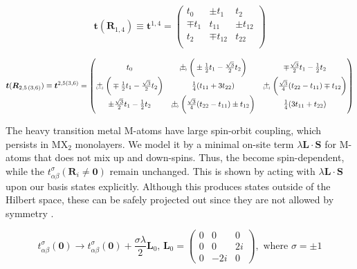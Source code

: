 \begin{equation}
\bm t (\bm R_{1, 4}) \equiv \bm t^{1, 4} =
\begin{pmatrix}
t_0 & \pm t_1 & t_2 \\
\mp t_1 & t_{11} & \pm t_{12} \\
t_2 & \mp t_{12} & t_{22} \\
\end{pmatrix}
\end{equation}

\begin{equation}
\bm t (\bm R_{2,5\,(3,6)})  \equiv \bm t^{2, 5 (3, 6)}  =
\begin{pmatrix}
t_0 & \Pm \bigg( \pm \frac{1}{2} t_1 - \frac{\sqrt{3}}{2} t_2 \bigg) & \mp \frac{\sqrt{3}}{2} t_1 - \frac{1}{2} t_2 \\
\Pm \bigg( \mp \frac{1}{2} t_1 - \frac{\sqrt{3}}{2} t_2 \bigg) & \frac{1}{4} ( t_{11} + 3 t_{22} ) & \Pm \bigg( \frac{\sqrt{3}}{4} ( t_{22} - t_{11} ) \mp t_{12} \bigg) \\
\pm \frac{\sqrt{3}}{2} t_1 - \frac{1}{2} t_2 & \Pm \bigg( \frac{\sqrt{3}}{4} ( t_{22} - t_{11} ) \pm t_{12} \bigg) & \frac{1}{4} ( 3 t_{11} + t_{22} )
\end{pmatrix}
\end{equation}

The heavy transition metal $\text{M}$-atoms have large spin-orbit coupling, which persists in $\text{M}\text{X}_2$ monolayers.
We model it by a minimal on-site term $\lambda \bm L \cdot \bm S$ for $\text{M}$-atoms that does not mix up and down-spins.
Thus, the  become spin-dependent, while the $t_{\alpha \beta}^\sigma ( \bm R_i \neq \bm 0 ) $ remain unchanged.
This is shown by acting with $\lambda \bm L \cdot \bm S$ upon our basis states explicitly.
Although this produces states outside of the Hilbert space, these can be safely projected out since they are not allowed by symmetry \cite{liu_three-band_2013,braz_electronic_2015}.

\begin{equation}
t_{\alpha \beta}^\sigma ( \bm 0 ) \rightarrow t_{\alpha \beta}^\sigma ( \bm 0 ) + \frac{\sigma \lambda}{2} \bm L_0 , \, \bm L_0 =
\begin{pmatrix}
0 & 0 & 0 \\
0 & 0 & 2i \\
0 & -2i & 0 
\end{pmatrix}
, \,\, \text{where} \,\,  \sigma = \pm 1
\end{equation}

